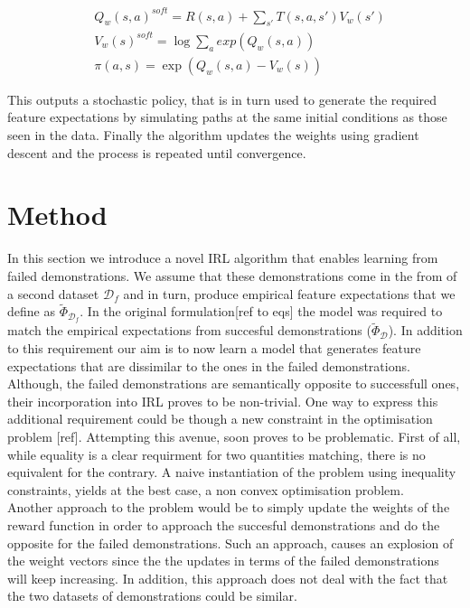 \documentclass[letterpaper]{article}
\begin{document}
	\begin{equation}
		\begin{split}
	&Q_w(s,a)^{soft} = R(s,a) + \sum_{s'}T(s,a,s')V_w(s')\\	
	&V_w(s)^{soft} = \log\sum_{a}exp(Q_w(s,a))\\
	&\pi(a,s) = \exp(Q_w(s,a) - V_w(s))
	\end{split}
	\end{equation}

 This outputs a stochastic policy, that is in turn used to generate the required feature expectations by simulating paths at the same initial conditions as those seen in the data. Finally the algorithm updates the weights using gradient descent and the process is repeated until convergence.

\section{Method}
	In this section we introduce a novel IRL algorithm that enables learning from failed demonstrations. We assume that these demonstrations come in the from of a second dataset $\mathcal{D}_f$ and in turn, produce empirical feature expectations that we define as $\widetilde{\Phi}_{\mathcal{D}_f}$. 
	In the original formulation[ref to eqs] the model was required to match the empirical expectations from succesful demonstrations ($\widetilde{\Phi}_{\mathcal{D}}$). In addition to this requirement 
	our aim is to now learn a model that generates feature expectations that are dissimilar to the ones in the failed demonstrations.  
	Although, the failed demonstrations are semantically opposite to successfull ones, their incorporation into IRL proves to be non-trivial.
	One way to express this additional requirement could be though a new constraint in the optimisation problem [ref]. Attempting this avenue, soon proves to be problematic. First of all, while equality is a clear requirment for two quantities matching, there is no equivalent for the contrary. A naive instantiation of the problem using inequality constraints, yields at the best case, a non convex optimisation problem.\\
	Another approach to the problem would be to simply update the weights of the reward function in order to approach the succesful demonstrations and do the opposite for the failed demonstrations. Such an approach, causes an explosion of the weight vectors since the the updates in terms of the failed demonstrations will keep increasing. In addition, this approach does not deal with the fact that the two datasets of demonstrations could be similar. 
\end{document}
